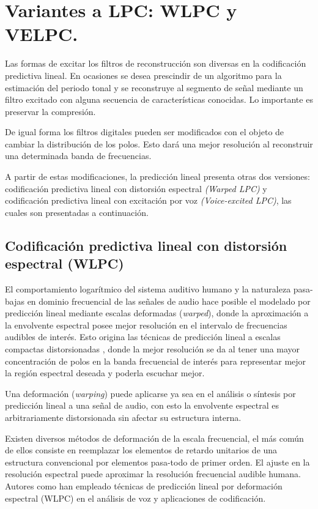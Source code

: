 \section{Variantes a LPC: WLPC y VELPC.}
 Las formas de excitar los filtros de reconstrucción son diversas en la codificación predictiva lineal. En ocasiones se desea prescindir de un algoritmo para la estimación del periodo tonal y se reconstruye al segmento de señal mediante un filtro excitado con alguna secuencia de características conocidas. Lo importante es preservar la compresión.
 
 De igual forma los filtros digitales pueden ser modificados con el objeto de cambiar la distribución de los polos. Esto dará una mejor resolución al reconstruir una determinada banda de frecuencias. 
 
 A partir de estas modificaciones, la predicción lineal presenta otras dos versiones: codificación predictiva lineal con distorsión espectral \emph{(Warped LPC)} y codificación predictiva lineal con excitación por voz \emph{(Voice-excited LPC)}, las cuales son presentadas a continuación.
 
\subsection{Codificación predictiva lineal con distorsión espectral (WLPC)}
El comportamiento logarítmico del sistema auditivo humano y la naturaleza pasa-bajas en dominio frecuencial de las señales de audio hace posible el modelado por predicción lineal mediante escalas deformadas (\emph{warped}), donde la aproximación a la envolvente espectral posee mejor resolución en el intervalo de frecuencias audibles de interés. Esto origina las técnicas de predicción lineal a escalas compactas distorsionadas \cite[]{Sturbe1980}, donde la mejor resolución se da al tener una mayor concentración de polos en la banda frecuencial de interés para representar mejor la región espectral deseada y poderla escuchar mejor. 

Una deformación (\emph{warping}) puede aplicarse ya sea en el análisis o síntesis por predicción lineal a una señal de audio, con esto la envolvente espectral es arbitrariamente distorsionada sin afectar su estructura interna.

Existen diversos métodos de deformación de la escala frecuencial, el más común de ellos consiste en reemplazar 
los elementos de retardo unitarios de una estructura convencional por elementos pasa-todo de primer orden. El ajuste en la resolución espectral puede aproximar la resolución frecuencial audible humana. Autores como \cite{Harma2001} han empleado técnicas de predicción lineal por deformación espectral (WLPC) en el análisis de voz y aplicaciones de codificación.

